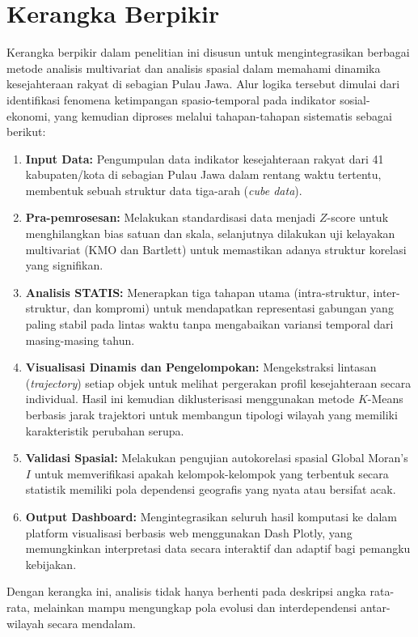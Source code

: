 \section{\normalsize Kerangka Berpikir}

Kerangka berpikir dalam penelitian ini disusun untuk mengintegrasikan berbagai metode analisis multivariat dan analisis spasial dalam memahami dinamika kesejahteraan rakyat di sebagian Pulau Jawa. Alur logika tersebut dimulai dari identifikasi fenomena ketimpangan spasio-temporal pada indikator sosial-ekonomi, yang kemudian diproses melalui tahapan-tahapan sistematis sebagai berikut:

\begin{enumerate}
    \item \textbf{Input Data:} Pengumpulan data indikator kesejahteraan rakyat dari 41 kabupaten/kota di sebagian Pulau Jawa dalam rentang waktu tertentu, membentuk sebuah struktur data tiga-arah (\textit{cube data}).
    \item \textbf{Pra-pemrosesan:} Melakukan standardisasi data menjadi $Z$-score untuk menghilangkan bias satuan dan skala, selanjutnya dilakukan uji kelayakan multivariat (KMO dan Bartlett) untuk memastikan adanya struktur korelasi yang signifikan.
    \item \textbf{Analisis STATIS:} Menerapkan tiga tahapan utama (intra-struktur, inter-struktur, dan kompromi) untuk mendapatkan representasi gabungan yang paling stabil pada lintas waktu tanpa mengabaikan variansi temporal dari masing-masing tahun.
    \item \textbf{Visualisasi Dinamis dan Pengelompokan:} Mengekstraksi lintasan (\textit{trajectory}) setiap objek untuk melihat pergerakan profil kesejahteraan secara individual. Hasil ini kemudian diklusterisasi menggunakan metode $K$-Means berbasis jarak trajektori untuk membangun tipologi wilayah yang memiliki karakteristik perubahan serupa.
    \item \textbf{Validasi Spasial:} Melakukan pengujian autokorelasi spasial Global Moran's $I$ untuk memverifikasi apakah kelompok-kelompok yang terbentuk secara statistik memiliki pola dependensi geografis yang nyata atau bersifat acak.
    \item \textbf{Output Dashboard:} Mengintegrasikan seluruh hasil komputasi ke dalam platform visualisasi berbasis web menggunakan Dash Plotly, yang memungkinkan interpretasi data secara interaktif dan adaptif bagi pemangku kebijakan.
\end{enumerate}

Dengan kerangka ini, analisis tidak hanya berhenti pada deskripsi angka rata-rata, melainkan mampu mengungkap pola evolusi dan interdependensi antar-wilayah secara mendalam.
